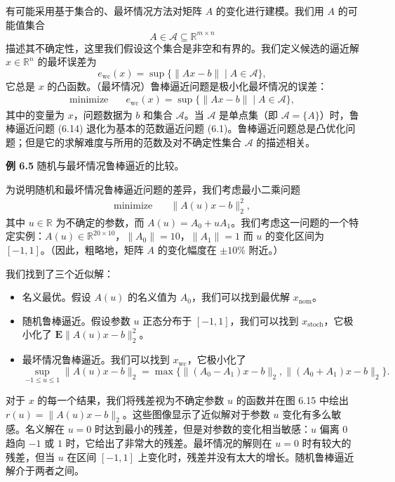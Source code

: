 \documentclass[UTF8, 12pt, fontset=fandol, oneside]{ctexart}
\begin{document}
有可能采用基于集合的、最坏情况方法对矩阵 $A$ 的变化进行建模。我们用 $A$ 的可能值集合
\[
A\in\mathcal{A}\subseteq\mathbb{R}^{m\times n}
\]
描述其不确定性，这里我们假设这个集合是非空和有界的。我们定义候选的逼近解 $x\in\mathbb{R}^n$ 的最坏误差为
\[
e_{\mathrm{wc}}(x)=\sup\{\|Ax-b\|\mid A\in\mathcal{A}\},
\]
它总是 $x$ 的凸函数。（最坏情况）鲁棒逼近问题是极小化最坏情况的误差：
\begin{equation}
\begin{aligned}
\text{minimize}\quad & e_{\mathrm{wc}}(x)=\sup\{\|Ax-b\|\mid A\in\mathcal{A}\},
\end{aligned}
\tag{6.14}
\end{equation}
其中的变量为 $x$，问题数据为 $b$ 和集合 $\mathcal{A}$。当 $\mathcal{A}$ 是单点集（即 $\mathcal{A}=\{A\}$）时，鲁棒逼近问题 (6.14) 退化为基本的范数逼近问题 (6.1)。鲁棒逼近问题总是凸优化问题；但是它的求解难度与所用的范数及对不确定性集合 $\mathcal{A}$ 的描述相关。

\noindent\textbf{例 6.5}\quad
随机与最坏情况鲁棒逼近的比较。

为说明随机和最坏情况鲁棒逼近问题的差异，我们考虑最小二乘问题
\[
\begin{aligned}
\text{minimize}\quad & \|A(u)x-b\|_2^2,
\end{aligned}
\]
其中 $u\in\mathbb{R}$ 为不确定的参数，而 $A(u)=A_0+uA_1$。我们考虑这一问题的一个特定实例：$A(u)\in\mathbb{R}^{20\times 10}$，$\|A_0\|=10$，$\|A_1\|=1$ 而 $u$ 的变化区间为 $[-1,1]$。（因此，粗略地，矩阵 $A$ 的变化幅度在 $\pm 10\%$ 附近。）

我们找到了三个近似解：
\begin{itemize}
\item 名义最优。假设 $A(u)$ 的名义值为 $A_0$，我们可以找到最优解 $x_{\mathrm{nom}}$。
\item 随机鲁棒逼近。假设参数 $u$ 正态分布于 $[-1,1]$，我们可以找到 $x_{\mathrm{stoch}}$，它极小化了 $\mathbf{E}\|A(u)x-b\|_2^2$。
\item 最坏情况鲁棒逼近。我们可以找到 $x_{\mathrm{wc}}$，它极小化了
\[
\sup_{-1\leq u\leq 1}\|A(u)x-b\|_2
=\max\{\|(A_0-A_1)x-b\|_2,\|(A_0+A_1)x-b\|_2\}.
\]
\end{itemize}
对于 $x$ 的每一个结果，我们将残差视为不确定参数 $u$ 的函数并在图 6.15 中绘出 $r(u)=\|A(u)x-b\|_2$。这些图像显示了近似解对于参数 $u$ 变化有多么敏感。名义解在 $u=0$ 时达到最小的残差，但是对参数的变化相当敏感：$u$ 偏离 $0$ 趋向 $-1$ 或 $1$ 时，它给出了非常大的残差。最坏情况的解则在 $u=0$ 时有较大的残差，但当 $u$ 在区间 $[-1,1]$ 上变化时，残差并没有太大的增长。随机鲁棒逼近解介于两者之间。
\end{document}
